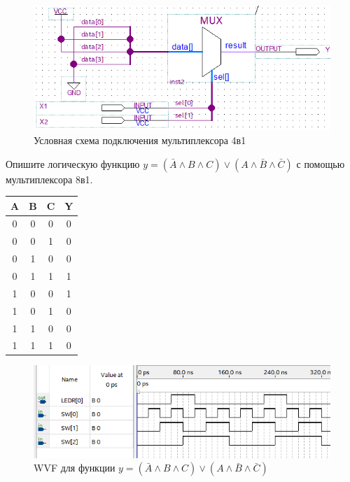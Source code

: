 \documentclass[a4paper,14pt]{article}
\begin{document}
\begin{figure}[H]
	\centering
	\includegraphics[width=0.6\linewidth]{img/z5_sh_iskl_ili}
	\caption{Условная схема подключения мультиплексора 4в1}
	\label{fig:z5_sh_iskl_ili}
\end{figure}

Опишите логическую функцию $y = (\bar A \wedge B \wedge C) \vee (A \wedge \bar B \wedge \bar C)$ с помощью мультиплексора 8в1.

\begin{table}[H]
	\begin{center}
		\begin{flushleft}
		\end{flushleft}
		\label{tab:func}
		\begin{tabular}{|c|c|c|c|}
			\hline
			A & B & C & Y \\ \hline
			0 & 0 & 0 & 0 \\ \hline
			0 & 0 & 1 & 0 \\ \hline
			0 & 1 & 0 & 0 \\ \hline
			0 & 1 & 1 & 1 \\ \hline
			1 & 0 & 0 & 1 \\ \hline
			1 & 0 & 1 & 0 \\ \hline
			1 & 1 & 0 & 0 \\ \hline
			1 & 1 & 1 & 0 \\ \hline
		\end{tabular}
	\end{center}
\end{table}



\begin{figure}[H]
	\centering
	\includegraphics[width=0.6\linewidth]{img/z5_wvf_b8}
	\caption{WVF для функции $y = (\bar A \wedge B \wedge C) \vee (A \wedge \bar B \wedge \bar C)$}
	\label{fig:z5_wvf_b8}
\end{figure}
\end{document}
